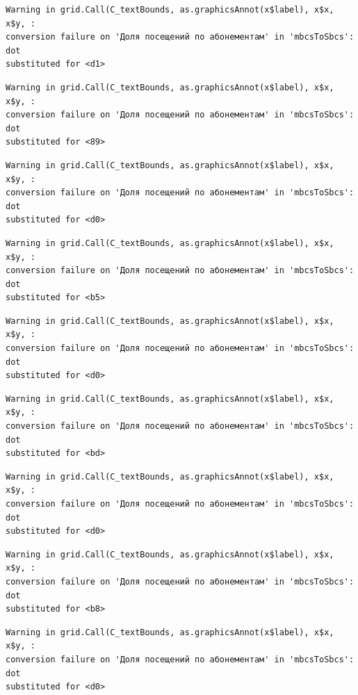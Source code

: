 \documentclass[
  letterpaper,
  DIV=11,
  numbers=noendperiod]{scrartcl}
\begin{document}
\begin{verbatim}
Warning in grid.Call(C_textBounds, as.graphicsAnnot(x$label), x$x, x$y, :
conversion failure on 'Доля посещений по абонементам' in 'mbcsToSbcs': dot
substituted for <d1>
\end{verbatim}

\begin{verbatim}
Warning in grid.Call(C_textBounds, as.graphicsAnnot(x$label), x$x, x$y, :
conversion failure on 'Доля посещений по абонементам' in 'mbcsToSbcs': dot
substituted for <89>
\end{verbatim}

\begin{verbatim}
Warning in grid.Call(C_textBounds, as.graphicsAnnot(x$label), x$x, x$y, :
conversion failure on 'Доля посещений по абонементам' in 'mbcsToSbcs': dot
substituted for <d0>
\end{verbatim}

\begin{verbatim}
Warning in grid.Call(C_textBounds, as.graphicsAnnot(x$label), x$x, x$y, :
conversion failure on 'Доля посещений по абонементам' in 'mbcsToSbcs': dot
substituted for <b5>
\end{verbatim}

\begin{verbatim}
Warning in grid.Call(C_textBounds, as.graphicsAnnot(x$label), x$x, x$y, :
conversion failure on 'Доля посещений по абонементам' in 'mbcsToSbcs': dot
substituted for <d0>
\end{verbatim}

\begin{verbatim}
Warning in grid.Call(C_textBounds, as.graphicsAnnot(x$label), x$x, x$y, :
conversion failure on 'Доля посещений по абонементам' in 'mbcsToSbcs': dot
substituted for <bd>
\end{verbatim}

\begin{verbatim}
Warning in grid.Call(C_textBounds, as.graphicsAnnot(x$label), x$x, x$y, :
conversion failure on 'Доля посещений по абонементам' in 'mbcsToSbcs': dot
substituted for <d0>
\end{verbatim}

\begin{verbatim}
Warning in grid.Call(C_textBounds, as.graphicsAnnot(x$label), x$x, x$y, :
conversion failure on 'Доля посещений по абонементам' in 'mbcsToSbcs': dot
substituted for <b8>
\end{verbatim}

\begin{verbatim}
Warning in grid.Call(C_textBounds, as.graphicsAnnot(x$label), x$x, x$y, :
conversion failure on 'Доля посещений по абонементам' in 'mbcsToSbcs': dot
substituted for <d0>
\end{verbatim}
\end{document}
